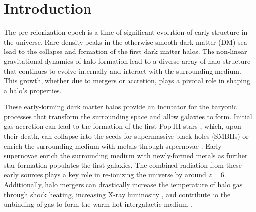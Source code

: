 \section{Introduction}
\label{sec:introduction}




The pre-reionization epoch is a time of significant evolution of early structure in the universe.  Rare density peaks in the otherwise smooth dark matter (DM) sea lead to the collapse and formation of the first dark matter halos.  The non-linear gravitational dynamics of halo formation lead to a diverse array of halo structure that continues to evolve internally and interact with the surrounding medium.  This growth, whether due to mergers or accretion, plays a pivotal role in shaping a halo's properties.

These early-forming dark matter halos provide an incubator for the baryonic processes that transform the surrounding space and allow galaxies to form.  Initial gas accretion can lead to the formation of the first Pop-III stars \citep{1986MNRAS.221...53C, 1997ApJ...474....1T}, which, upon their death, can collapse into the seeds for supermassive black holes (SMBHs) \citep{2001ApJ...551L..27M, 2003ApJ...582..559V, 2003MNRAS.340..647I, 2009ApJ...696.1798T, 2009ApJ...701L.133A, 2012ApJ...754...34J, 2011MNRAS.414.1127M} or enrich the surrounding medium with metals through supernovae \citep{2003ApJ...591..288H}.  Early supernovae enrich the surrounding medium with newly-formed metals as further star formation populates the first galaxies.  The combined radiation from these early sources plays a key role in re-ionizing the universe by around $z = 6$.  Additionally, halo mergers can drastically increase the temperature of halo gas through shock heating, increasing X-ray luminosity \citep{2009MNRAS.397..190S}, and contribute to the unbinding of gas to form the warm-hot intergalactic medium \citep{2010MNRAS.405L..31S}.


